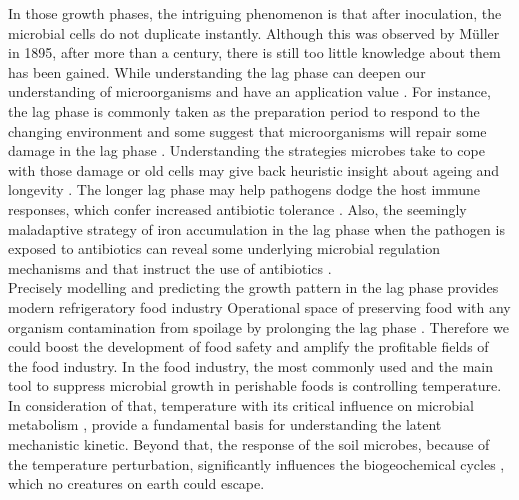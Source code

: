 \documentclass[a4paper]{article}
\begin{document}
In those growth phases, the intriguing phenomenon is that after inoculation, the microbial cells do not duplicate instantly. Although this was observed by Müller in 1895, after more than a century, there is still too little knowledge about them has been gained. While understanding the lag phase can deepen our understanding of microorganisms and have an application value \citep{bertrand2019lag}. For instance, the lag phase is commonly taken as the preparation period to respond to the changing environment and some suggest that microorganisms will repair some damage in the lag phase \citep{rolfe2012lag}. Understanding the strategies microbes take to cope with those damage or old cells may give back heuristic insight about ageing and longevity \citep{pin2009network}. The longer lag phase may help pathogens dodge the host immune responses, which confer increased antibiotic tolerance \citep{li2016importance}. Also, the seemingly maladaptive strategy of iron accumulation in the lag phase when the pathogen is exposed to antibiotics can reveal some underlying microbial regulation mechanisms and that instruct the use of antibiotics \citep{rolfe2012lag}.\\

Precisely modelling and predicting the growth pattern in the lag phase provides modern refrigeratory food industry Operational space of preserving food with any organism contamination from spoilage by prolonging the lag phase \citep{swinnen2004predictive,perez201318,ghidelli2018recent,adams2020microbiology}. Therefore we could boost the development of food safety and amplify the profitable fields of the food industry. In the food industry, the most commonly used and the main tool to suppress microbial growth in perishable foods is controlling temperature. In consideration of that, temperature with its critical influence on microbial metabolism \citep{brown2004toward}, provide a fundamental basis for understanding the latent mechanistic kinetic. Beyond that, the response of the soil microbes, because of the temperature perturbation, significantly influences the biogeochemical cycles \citep{davidson2006temperature}, which no creatures on earth could escape. \\
\end{document}
